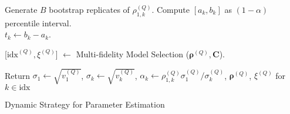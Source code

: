 \begin{algorithm}[!ht]
{{{    }{
        
            Generate $B$ bootstrap replicates of $\rho_{1,k}^{(Q)}$. Compute $[a_k, b_k]$ as $(1-\alpha)$ percentile interval. \\
            $t_k \gets b_k - a_k$.
        
    }

    
    }
    
    
    [$\text{idx}^{(Q)},\xi^{(Q)}$] $\gets$ Multi-fidelity Model Selection ($\boldsymbol{\rho}^{(Q)},\boldsymbol{C}$).\\
    
    
    
    }


    

    
    
    
    
    
    
Return $\sigma_1 \gets \sqrt{v_1^{(Q)}}$, $\sigma_k \gets \sqrt{v_k^{(Q)}}$, $\alpha_k \gets \rho_{1,k}^{(Q)} \sigma_1^{(Q)} / \sigma_k^{(Q)}$, $\boldsymbol{\rho}^{(Q)}$, $\xi^{(Q)}$ for $k \in \text{idx}$
\caption{Dynamic Strategy for Parameter Estimation}
\end{algorithm}
\ULforem
%



